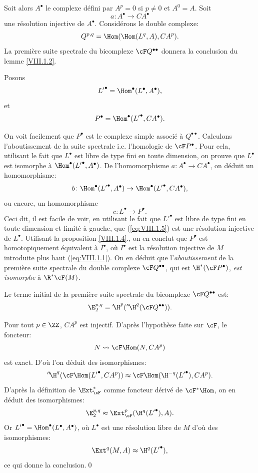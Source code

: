 \setcounter{equation}{1} Soit alors $A^\bullet$ le complexe d\'efini par $A^p=0$ si $p\neq 0$ et $A^0=A$. Soit
\[a\colon A^\bullet \to CA^\bullet\]
une r\'esolution injective de $A^\bullet$. Consid\'erons le double complexe:
\begin{equation} \label{eq:VIII.1.2} Q^{p, q}=\Hom(\Hom(L^q, A), CA^p).
\end{equation}
La premi\`ere suite spectrale du bicomplexe ${\cF}Q^{\bullet\bullet}$ donnera la conclusion du lemme \ref{VIII.1.2}.

Posons
\begin{equation} \label{eq:VIII.1.3} {L'}^\bullet=\Hom^\bullet(L^\bullet, A^\bullet),
\end{equation}
et
\begin{equation} \label{eq:VIII.1.4} P^\bullet=\Hom^\bullet({L'}^\bullet, CA^\bullet).
\end{equation}

On voit facilement que $P^\bullet$ est le complexe simple associ\'e \`a $Q^{\bullet\bullet}$. Calculons l'aboutissement de la suite spectrale i.e. l'homologie de ${\cF}P^\bullet$. Pour cela, utilisant le fait que $L^\bullet$ est libre de type fini en toute dimension, on prouve que $L^\bullet$ est isomorphe \`a $\Hom^\bullet({L'}^\bullet, A^\bullet)$. De l'homomorphisme $a\colon A^\bullet\to CA^\bullet$, on d\'eduit un homomorphisme:
\[b\colon \Hom^\bullet({L'}^\bullet, A^\bullet)\to \Hom^\bullet({L'}^\bullet, CA^\bullet), \]
ou encore, un homomorphisme
\begin{equation} \label{eq:VIII.1.5} c\colon L^\bullet\to P^\bullet.
\end{equation}
Ceci dit, il est facile de voir, en utilisant le fait que ${L'}^\bullet$ est libre de type fini en toute dimension et limit\'e \`a gauche, que (\ref{eq:VIII.1.5}) est une r\'esolution injective de $L^\bullet$. Utilisant la proposition \ref{VIII.1.4}., on en conclut que $P^\bullet$ est homotopiquement \'equivalent \`a $I^\bullet$, o\`u $I^\bullet$ est la r\'esolution injective de $M$ introduite plus haut (\ref{eq:VIII.1.1}). On en d\'eduit que l'\emph{aboutissement} de la premi\`ere suite spectrale du double complexe ${\cF}Q^{\bullet\bullet}$, qui est $\H^\ast({\cF}P^\bullet)$, \emph{est isomorphe} \`a $\R^\ast {\cF}(M)$.

Le terme initial de la premi\`ere suite spectrale du bicomplexe ${\cF}Q^{\bullet\bullet}$ est:
\[
\E^{p, q}_2 = {'\!\H}^p({''\!\H}^q({\cF}Q^{\bullet\bullet})).
\]

Pour tout $p\in\ZZ$, $CA^p$ est injectif. D'apr\`es l'hypoth\`ese faite sur ${\cF}$, le foncteur:
\[
N \rightsquigarrow {\cF}\Hom(N, CA^p)\]
est exact. D'o\`u l'on d\'eduit des isomorphismes:
\[
{''\!\H}^q({\cF}\Hom({L'}^\bullet, CA^p))\approx {\cF}\Hom(\H^{-q}({L'}^\bullet), CA^p).
\]
D'apr\`es la d\'efinition de $\Ext^\ast_{{\cF}}$ comme foncteur d\'eriv\'e de ${\cF}{^\ast}\Hom$, on en d\'eduit des isomorphismes:
\[
\E^{p, q}_2 \approx \Ext^p_{{\cF}}(\H^q({L'}^\bullet), A).
\]
Or ${L'}^\bullet=\Hom^\bullet(L^\bullet, A^\bullet)$, o\`u $L^\bullet$ est une r\'esolution libre de $M$ d'o\`u des isomorphismes:
\[
\Ext^{q}(M, A)\approx \H^q({L'}^\bullet),
\]
ce qui donne la conclusion.\qed

